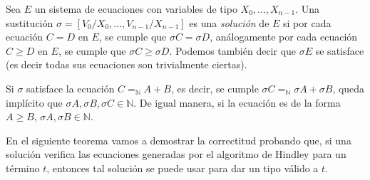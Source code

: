 \begin{definicion}[Solución]
Sea $E$ un sistema de ecuaciones con variables de tipo $X_0,\dots,X_{n-1}$. Una sustitución $\sigma = [V_0 / X_0, \dots, V_{n-1} / X_{n-1}]$ es una \emph{solución} de $E$ si por cada ecuación $C = D$ en $E$, se cumple que $\sigma C = \sigma D$, análogamente por cada ecuación $C \geq D$ en $E$, se cumple que $\sigma C \geq \sigma D$. Podemos también decir que $\sigma E$ se satisface (es decir todas sus ecuaciones son trivialmente ciertas).
\end{definicion}

\begin{observacion}
    Si $\sigma$ satisface la ecuación $C=_\mathbb{N} A+B$, es decir, se cumple $\sigma C =_\mathbb{N} \sigma A + \sigma B$, queda implícito que $\sigma A, \sigma B, \sigma C \in \mathbb{N}$. De igual manera, si la ecuación es de la forma $A\geq B$, $\sigma A, \sigma B \in \mathbb{N}$.
\end{observacion}


 En el siguiente teorema vamos a demostrar la correctitud probando que, si una solución verifica las ecuaciones generadas por el algoritmo de Hindley para un término $t$, entonces tal solución se puede usar para dar un tipo válido a $t$.
 
